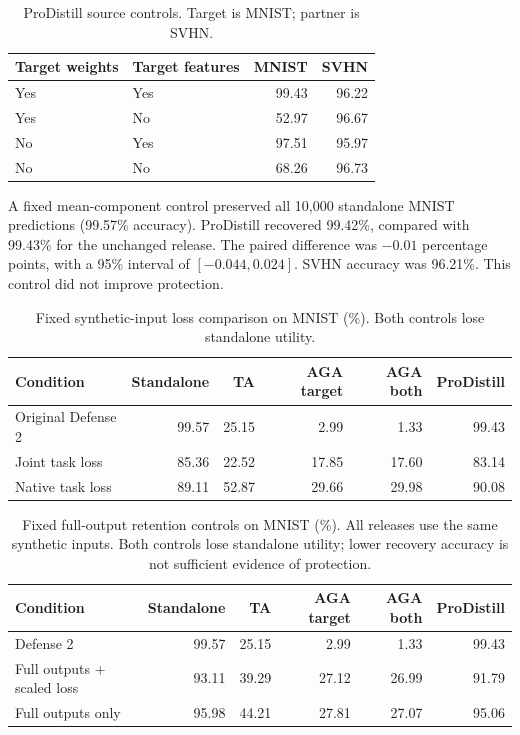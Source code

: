 \begin{table}[t]
\centering
\caption{ProDistill source controls. Target is MNIST; partner is SVHN.}
\begin{tabular}{llrr}
\toprule
Target weights & Target features & MNIST & SVHN \\
\midrule
Yes & Yes & 99.43 & 96.22 \\
Yes & No & 52.97 & 96.67 \\
No & Yes & 97.51 & 95.97 \\
No & No & 68.26 & 96.73 \\
\bottomrule
\end{tabular}
\end{table}


A fixed mean-component control preserved all 10,000 standalone MNIST
predictions (99.57\% accuracy). ProDistill recovered 99.42\%, compared with
99.43\% for the unchanged release. The paired difference was $-0.01$ percentage
points, with a 95\% interval of $[-0.044,0.024]$. SVHN accuracy was 96.21\%.
This control did not improve protection.

\begin{table}[t]
\centering
\caption{Fixed synthetic-input loss comparison on MNIST (\%). Both controls lose standalone utility.}
\begin{tabular}{lrrrrr}
\toprule
Condition & Standalone & TA & AGA target & AGA both & ProDistill \\
\midrule
Original Defense 2 & 99.57 & 25.15 & 2.99 & 1.33 & 99.43 \\
Joint task loss & 85.36 & 22.52 & 17.85 & 17.60 & 83.14 \\
Native task loss & 89.11 & 52.87 & 29.66 & 29.98 & 90.08 \\
\bottomrule
\end{tabular}
\end{table}


\begin{table}[t]
\centering
\caption{Fixed full-output retention controls on MNIST (\%). All releases use the same synthetic inputs. Both controls lose standalone utility; lower recovery accuracy is not sufficient evidence of protection.}
\begin{tabular}{lrrrrr}
\toprule
Condition & Standalone & TA & AGA target & AGA both & ProDistill \\
\midrule
Defense 2 & 99.57 & 25.15 & 2.99 & 1.33 & 99.43 \\
Full outputs + scaled loss & 93.11 & 39.29 & 27.12 & 26.99 & 91.79 \\
Full outputs only & 95.98 & 44.21 & 27.81 & 27.07 & 95.06 \\
\bottomrule
\end{tabular}
\end{table}


